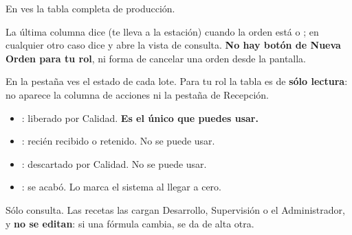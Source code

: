 \newpage
{}


En  ves la tabla completa de producción.


\vspace{6pt}

La última columna dice  (te lleva a la estación) cuando la orden
está \pendiente{} o \enproceso; en cualquier otro caso dice  y
abre la vista de consulta. \textbf{No hay botón de Nueva Orden para tu rol}, ni
forma de cancelar una orden desde la pantalla.



\vspace{6pt}

En la pestaña  ves el estado de cada lote. Para tu rol la tabla es de
\textbf{sólo lectura}: no aparece la columna de acciones ni la pestaña de Recepción.


\vspace{4pt}

\begin{itemize}
    \item \aprobado{}: liberado por Calidad. \textbf{Es el único que puedes usar.}
    \item \cuarentena{}: recién recibido o retenido. No se puede usar.
    \item \rechazado{}: descartado por Calidad. No se puede usar.
    \item \agotado{}: se acabó. Lo marca el sistema al llegar a cero.
\end{itemize}

\newpage
{}


\vspace{6pt}

Sólo consulta. Las recetas las cargan Desarrollo, Supervisión o el Administrador, y
\textbf{no se editan}: si una fórmula cambia, se da de alta otra.

